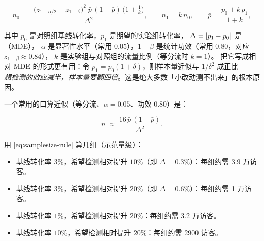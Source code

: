 \begin{equation}
n_0 \;=\; \frac{\big(z_{1-\alpha/2} + z_{1-\beta}\big)^2 \;\bar p\,(1-\bar p)\,\Big(1 + \tfrac{1}{k}\Big)}{\Delta^2},
\qquad n_1 = k\,n_0,
\qquad \bar p = \frac{p_0 + k\,p_1}{1+k} ,
\label{eq:samplesize}
\end{equation}

其中 $p_0$ 是对照组基线转化率，$p_1$ 是期望的实验组转化率，
$\Delta = \left\lvert p_1 - p_0 \right\rvert$ 是（MDE），
$\alpha$ 是显著性水平（常用 0.05），$1-\beta$ 是统计功效（常用 0.80，对应 $z_{1-\beta} \approx 0.84$），
$k$ 是实验组与对照组的流量比例（等分流时 $k=1$）。
把它写成相对 MDE 的形式更有用：令 $p_1 = p_0(1+\delta)$，则样本量近似与 $1/\delta^2$ 成正比——
\emph{想检测的效应减半，样本量要翻四倍}。这是绝大多数「小改动测不出来」的根本原因。

一个常用的口算近似（等分流、$\alpha=0.05$、功效 0.80）是：

\begin{equation}
n \;\approx\; \frac{16\,\bar p\,(1-\bar p)}{\Delta^2} .
\label{eq:samplesize-rule}
\end{equation}

用 \cref{eq:samplesize-rule} 算几组（示范量级）：

\begin{itemize}
  \item 基线转化率 $3\%$，希望检测相对提升 $10\%$（即 $\Delta = 0.3\%$）：每组约需 3.9 万访客。
  \item 基线转化率 $3\%$，希望检测相对提升 $20\%$（即 $\Delta = 0.6\%$）：每组约需 1 万访客。
  \item 基线转化率 $1\%$，希望检测相对提升 $20\%$：每组约需 3.2 万访客。
  \item 基线转化率 $10\%$，希望检测相对提升 $20\%$：每组约需 2900 访客。
\end{itemize}

